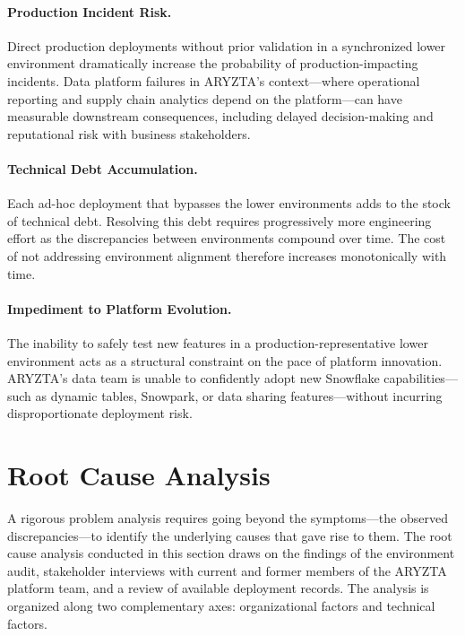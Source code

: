 \paragraph{Production Incident Risk.} Direct production deployments without prior validation in a synchronized lower environment dramatically increase the probability of production-impacting incidents. Data platform failures in ARYZTA's context---where operational reporting and supply chain analytics depend on the platform---can have measurable downstream consequences, including delayed decision-making and reputational risk with business stakeholders.

\paragraph{Technical Debt Accumulation.} Each ad-hoc deployment that bypasses the lower environments adds to the stock of technical debt. Resolving this debt requires progressively more engineering effort as the discrepancies between environments compound over time. The cost of not addressing environment alignment therefore increases monotonically with time.

\paragraph{Impediment to Platform Evolution.} The inability to safely test new features in a production-representative lower environment acts as a structural constraint on the pace of platform innovation. ARYZTA's data team is unable to confidently adopt new Snowflake capabilities---such as dynamic tables, Snowpark, or data sharing features---without incurring disproportionate deployment risk.

\section{Root Cause Analysis}
\label{sec:root-cause}

A rigorous problem analysis requires going beyond the symptoms---the observed discrepancies---to identify the underlying causes that gave rise to them. The root cause analysis conducted in this section draws on the findings of the environment audit, stakeholder interviews with current and former members of the ARYZTA platform team, and a review of available deployment records. The analysis is organized along two complementary axes: organizational factors and technical factors.


